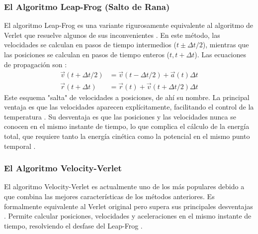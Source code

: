 \subsubsection{El Algoritmo Leap-Frog (Salto de Rana)}

El algoritmo Leap-Frog es una variante rigurosamente equivalente al algoritmo de Verlet que resuelve algunos de sus inconvenientes \cite[113]{frenkel2002understanding}. En este método, las velocidades se calculan en pasos de tiempo intermedios ($t \pm \Delta t / 2$), mientras que las posiciones se calculan en pasos de tiempo enteros ($t, t+\Delta t$). Las ecuaciones de propagación son \cite[113]{frenkel2002understanding}:
\begin{align}
\vec{v}(t + \Delta t/2) &= \vec{v}(t - \Delta t/2) + \vec{a}(t)\Delta t \\
\vec{r}(t + \Delta t) &= \vec{r}(t) + \vec{v}(t + \Delta t/2)\Delta t
\label{eq:leapfrog}
\end{align}
Este esquema "salta" de velocidades a posiciones, de ahí su nombre. La principal ventaja es que las velocidades aparecen explícitamente, facilitando el control de la temperatura \cite[452]{jensen2017introduction}. Su desventaja es que las posiciones y las velocidades nunca se conocen en el mismo instante de tiempo, lo que complica el cálculo de la energía total, que requiere tanto la energía cinética como la potencial en el mismo punto temporal \cite[113]{frenkel2002understanding}.

\subsubsection{El Algoritmo Velocity-Verlet}

El algoritmo Velocity-Verlet es actualmente uno de los más populares debido a que combina las mejores características de los métodos anteriores. Es formalmente equivalente al Verlet original pero supera sus principales desventajas \cite[113]{frenkel2002understanding}. Permite calcular posiciones, velocidades y aceleraciones en el mismo instante de tiempo, resolviendo el desfase del Leap-Frog \cite[452]{jensen2017introduction}.

